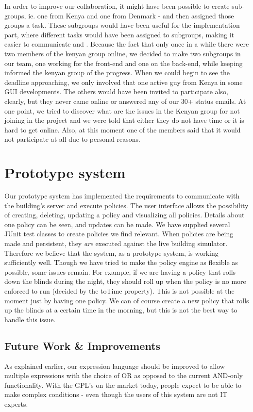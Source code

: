 In order to improve our collaboration, it might have been possible to create sub-groups, ie. one from Kenya and one from Denmark - and then assigned those groups a task. These subgroups would have been useful for the implementation part, where different tasks would have been assigned to subgroups, making it easier to communicate and . Because the fact that only once in a while there were two members of the kenyan group online, we decided to make two subgroups in our team, one working for the front-end and one on the back-end, while keeping informed the kenyan group of the progress.  When we could begin to see the deadline approaching, we only involved that one active guy from Kenya in some GUI developments. The others would have been invited to participate also, clearly, but they never came online or answered any of our 30+ status emails. At one point, we tried to discover what are the issues in the Kenyan group for not joining in the project and we were told that either they do not have time or it is hard to get online. Also, at this moment one of the members said that it would not participate at all due to personal reasons. 

\section{Prototype system}\label{sec:product}
Our prototype system has implemented the requirements to communicate with the building's server and execute policies. The user interface allows the possibility of creating, deleting, updating a policy and visualizing all policies. Details about one policy can be seen, and updates can be made. 
We have supplied several JUnit test classes to create policies we find relevant. When policies are being made and persistent, they \textit{are} executed against the live building simulator. Therefore we believe that the system, as a prototype system, is working sufficiently well.
Though we have tried to make the policy engine as flexible as possible, some issues remain. For example, if we are having a policy that rolls down the blinds during the night, they should roll up when the policy is no more enforced to run (decided by the toTime property). This is not possible at the moment just by having one policy. We can of course create a new policy that rolls up the blinds at a certain time in the morning, but this is not the best way to handle this issue.

\subsection{Future Work \& Improvements}\label{subsec:improvements}
As explained earlier, our expression language should be improved to allow multiple expressions with the choice of OR as opposed to the current AND-only functionality. With the GPL's on the market today, people expect to be able to make complex conditions - even though the users of this system are not IT experts. 

